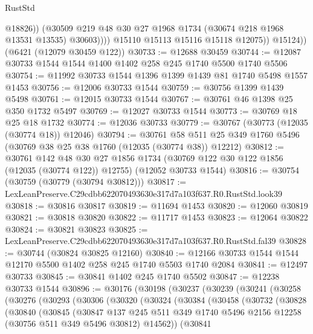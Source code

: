 \begin{lexlean}{RustStd}
\begin{coremodule}
                      @18826))
                  (@30509 @219 @48 @30 @27 @1968 @1734 (@30674 @218 @1968 @13531 @13535) @30603))))
            @15110
            @15113
            @15116
            @15118
            @12075))
        @15124))
    (@6421 (@12079 @30459 @122))
@30733 := @12688 @30459
@30744 := @12087 @30733 @1544 @1544 @1400 @1402 @258 @245 @1740 @5500 @1740 @5506
@30754 := @11992 @30733 @1544 @1396 @1399 @1439 @81 @1740 @5498 @1557 @1453
@30756 := @12006 @30733 @1544
@30759 := @30756 @1399 @1439 @5498
@30761 := @12015 @30733 @1544
@30767 := @30761 @46 @1398 @25 @350 @1732 @5497
@30769 := @12027 @30733 @1544
@30773 := @30769 @18 @25 @18 @1732
@30774 := @12036 @30733
@30779 := @30767 (@30773 (@12035 (@30774 @18)) @12046)
@30794 := @30761
    @58
    @511
    @25
    @349
    @1760
    @5496
    (@30769 @38 @25 @38 @1760 (@12035 (@30774 @38)) @12212)
@30812 := @30761
    @142
    @48
    @30
    @27
    @1856
    @1734
    (@30769 @122 @30 @122 @1856 (@12035 (@30774 @122)) @12755)
    (@12052 @30733 @1544)
@30816 := @30754 (@30759 (@30779 (@30794 @30812)))
@30817 := LexLeanPreserve.C29cdbb622070493630e317d7a103f637.R0.RustStd.look39
@30818 := @30816 @30817
@30819 := @11694 @1453
@30820 := @12060 @30819
@30821 := @30818 @30820
@30822 := @11717 @1453
@30823 := @12064 @30822
@30824 := @30821 @30823
@30825 := LexLeanPreserve.C29cdbb622070493630e317d7a103f637.R0.RustStd.fal39
@30828 := @30744 (@30824 @30825 @12160)
@30840 := @12166 @30733 @1544 @1544 @12170 @5500 @1402 @258 @245 @1740 @5503 @1740 @2084
@30841 := @12497 @30733
@30845 := @30841 @1402 @245 @1740 @5502
@30847 := @12238 @30733 @1544
@30896 := @30176
    (@30198
      (@30237
        (@30239
          (@30241
            (@30258
              (@30276
                (@30293
                  (@30306
                    (@30320
                      (@30324
                        (@30384
                          (@30458
                            (@30732
                              (@30828
                                (@30840
                                  (@30845
                                    (@30847
                                      @137
                                      @245
                                      @511
                                      @349
                                      @1740
                                      @5496
                                      @2156
                                      @12258
                                      (@30756 @511 @349 @5496 @30812)
                                      @14562))
                                  (@30841

\end{coremodule}
\end{lexlean}

